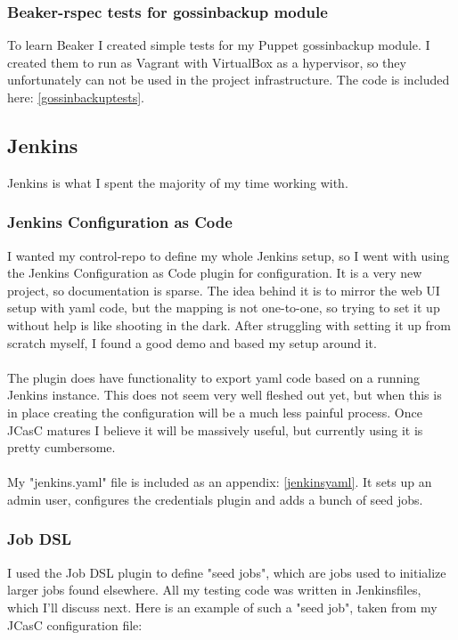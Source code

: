 \subsubsection{Beaker-rspec tests for gossinbackup module}

To learn Beaker I created simple tests for my Puppet gossinbackup module. I created them to run as Vagrant with VirtualBox as a hypervisor, so they unfortunately can not be used in the project infrastructure. The code is included here: \ref{gossinbackuptests}.

\subsection{Jenkins}

Jenkins is what I spent the majority of my time working with.

\subsubsection{Jenkins Configuration as Code}

I wanted my control-repo to define my whole Jenkins setup, so I went with using the Jenkins Configuration as Code plugin for configuration. It is a very new project, so documentation is sparse. The idea behind it is to mirror the web UI setup with yaml code, but the mapping is not one-to-one, so trying to set it up without help is like shooting in the dark. After struggling with setting it up from scratch myself, I found a good demo\cite{jcascdemogithub} and based my setup around it. 
\\
\\
The plugin does have functionality to export yaml code based on a running Jenkins instance. This does not seem very well fleshed out yet, but when this is in place creating the configuration will be a much less painful process. Once JCasC matures I believe it will be massively useful, but currently using it is pretty cumbersome.
\\
\\
My "jenkins.yaml" file is included as an appendix: \ref{jenkinsyaml}. It sets up an admin user, configures the credentials plugin and adds a bunch of seed jobs.

\subsubsection{Job DSL}

I used the Job DSL plugin \cite{jobdslgithub} to define "seed jobs", which are jobs used to initialize larger jobs found elsewhere. All my testing code was written in Jenkinsfiles, which I'll discuss next. Here is an example of such a "seed job", taken from my JCasC configuration file:


